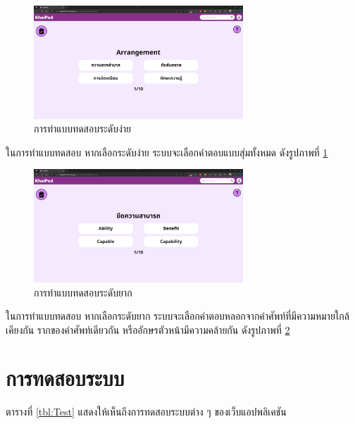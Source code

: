 \documentclass[12pt,oneside,openright,a4paper]{cpe-thai-project}
\begin{document}
\begin{figure}[!h]\centering
	\includegraphics[width=0.7\textwidth, keepaspectratio=true]{image/chap4/Final/quiz easy.png}
	\caption{{การทำแบบทดสอบระดับง่าย}}\label{fig:chap4FinQuizEasy}
\end{figure}
\hspace{1cm}
ในการทำแบบทดสอบ หากเลือกระดับง่าย ระบบจะเลือกคำตอบแบบสุ่มทั้งหมด
ดังรูปภาพที่ \ref{fig:chap4FinQuizEasy}

\pagebreak
\begin{figure}[!h]\centering
	\includegraphics[width=0.7\textwidth, keepaspectratio=true]{image/chap4/Final/quiz hard.png}
	\caption{{การทำแบบทดสอบระดับยาก}}\label{fig:chap4FinQuizHard}
\end{figure}
\hspace{1cm}
ในการทำแบบทดสอบ หากเลือกระดับยาก ระบบจะเลือกคำตอบหลอกจากคำศัพท์ที่มีความหมายใกล้เคียงกัน
รากของคำศัพท์เดียวกัน หรืออักษรตัวหน้ามีความคล้ายกัน ดังรูปภาพที่ \ref{fig:chap4FinQuizHard}

\pagebreak
\section{การทดสอบระบบ}
\hspace{1cm}
ตารางที่ \ref{tbl:Test} แสดงให้เห็นถึงการทดสอบระบบต่าง ๆ ของเว็บแอปพลิเคชัน
\end{document}
